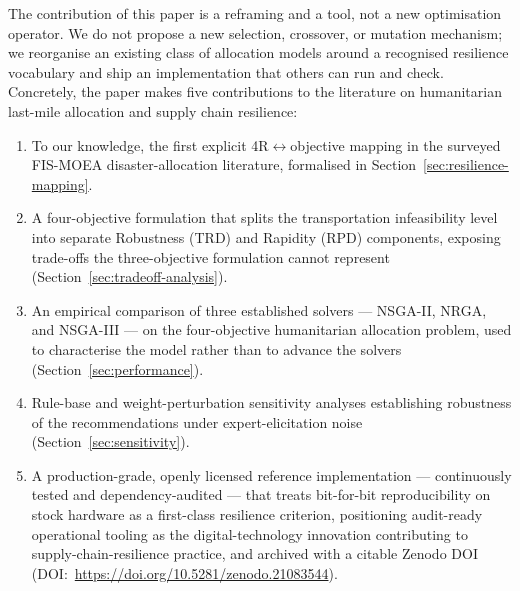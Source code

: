 \documentclass[applsci,article,submit,moreauthors,pdftex]{Definitions/mdpi}
\begin{document}
The contribution of this paper is a reframing and a tool, not a new
optimisation operator. We do not propose a new selection, crossover, or
mutation mechanism; we reorganise an existing class of allocation models
around a recognised resilience vocabulary and ship an implementation that
others can run and check. Concretely, the paper makes five contributions to
the literature on humanitarian last-mile allocation and supply chain
resilience:
\begin{enumerate}
    \item To our knowledge, the first explicit 4R$\leftrightarrow$objective mapping in the
          surveyed FIS-MOEA disaster-allocation literature, formalised in
          Section~\ref{sec:resilience-mapping}.
    \item A four-objective formulation that splits the transportation
          infeasibility level into separate Robustness (TRD) and Rapidity (RPD)
          components, exposing trade-offs the three-objective formulation
          cannot represent (Section~\ref{sec:tradeoff-analysis}).
    \item An empirical comparison of three established solvers --- NSGA-II,
          NRGA, and NSGA-III --- on the four-objective humanitarian allocation
          problem, used to characterise the model rather than to advance the
          solvers (Section~\ref{sec:performance}).
    \item Rule-base and weight-perturbation sensitivity analyses establishing
          robustness of the recommendations under expert-elicitation noise
          (Section~\ref{sec:sensitivity}).
    \item A production-grade, openly licensed reference implementation ---
          continuously tested and dependency-audited --- that treats
          bit-for-bit reproducibility on stock hardware as a first-class
          resilience criterion, positioning audit-ready operational tooling as
          the digital-technology innovation contributing to supply-chain-resilience
          practice, and archived with a citable Zenodo DOI
          (DOI:~\url{https://doi.org/10.5281/zenodo.21083544}).
\end{enumerate}
\end{document}
